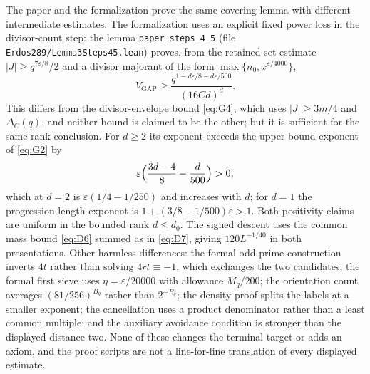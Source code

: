 \documentclass[11pt,letterpaper]{article}
\numberwithin{equation}{section}
\theoremstyle{plain}
\theoremstyle{remark}
\newcommand{\Vgap}{V_{\mathrm{GAP}}}
\begin{document}
The paper and the formalization prove the same covering lemma with different intermediate estimates. The formalization uses an explicit fixed power loss in the divisor-count step: the lemma \texttt{paper\_steps\_4\_5} (file \texttt{Erdos289/Lemma3Steps45.lean}) proves, from the retained-set estimate $|J|\ge q^{7\varepsilon/8}/2$ and a divisor majorant of the form $\max\{n_0,x^{\varepsilon/4000}\}$,
\[
\Vgap\ge\frac{q^{1-d\varepsilon/8-d\varepsilon/500}}{(16Cd)^d}.
\]
This differs from the divisor-envelope bound \eqref{eq:G4}, which uses $|J|\ge3m/4$ and $\Delta_C(q)$, and neither bound is claimed to be the other; but it is sufficient for the same rank conclusion. For $d\ge2$ its exponent exceeds the upper-bound exponent of \eqref{eq:G2} by
\[
\varepsilon\Bigl(\frac{3d-4}8-\frac d{500}\Bigr)>0,
\]
which at $d=2$ is $\varepsilon(1/4-1/250)$ and increases with $d$; for $d=1$ the progression-length exponent is $1+(3/8-1/500)\varepsilon>1$. Both positivity claims are uniform in the bounded rank $d\le d_0$. The signed descent uses the common mass bound \eqref{eq:D6} summed as in \eqref{eq:D7}, giving $120L^{-1/40}$ in both presentations. Other harmless differences: the formal odd-prime construction inverts $4t$ rather than solving $4rt\equiv-1$, which exchanges the two candidates; the formal first sieve uses $\eta=\varepsilon/20000$ with allowance $M_q/200$; the orientation count averages $(81/256)^{B_q}$ rather than $2^{-B_q}$; the density proof splits the labels at a smaller exponent; the cancellation uses a product denominator rather than a least common multiple; and the auxiliary avoidance condition is stronger than the displayed distance two. None of these changes the terminal target or adds an axiom, and the proof scripts are not a line-for-line translation of every displayed estimate.
\end{document}

